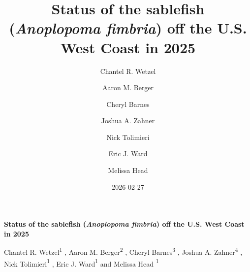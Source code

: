 \documentclass[
  english,
]{article}
\title{Status of the sablefish (\emph{Anoplopoma fimbria}) off the U.S.
West Coast in 2025}
\author{Chantel R. Wetzel \and Aaron M. Berger \and Cheryl
Barnes \and Joshua A. Zahner \and Nick Tolimieri \and Eric J.
Ward \and Melissa Head}
\date{2026-02-27}
\begin{document}
  \begin{titlepage}

  \begin{minipage}[b][\textheight][s]{\textwidth}


  \raggedright




  {\huge\bfseries\nohyphens{Status of the sablefish (\emph{Anoplopoma
  fimbria}) off the U.S. West Coast in 2025}}\\[1\baselineskip]



  \vspace{1\baselineskip}


  \vspace{1\baselineskip}

   {\large{Chantel R. Wetzel}}{\textsuperscript{1}}%
  ,
   {\large{Aaron M. Berger}}{\textsuperscript{2}}%
  ,
   {\large{Cheryl Barnes}}{\textsuperscript{3}}%
  ,
   {\large{Joshua A. Zahner}}{\textsuperscript{4}}%
  ,
   {\large{Nick Tolimieri}}{\textsuperscript{1}}%
  ,
   {\large{Eric J. Ward}}{\textsuperscript{1}}%
  { and \large{Melissa Head}}%
  {\textsuperscript{1}}%



  \vspace{2\baselineskip}


\end{minipage}
\end{titlepage}
\end{document}
